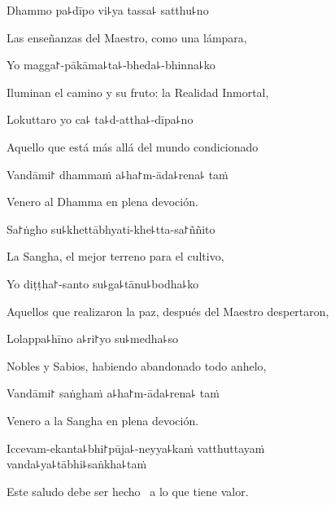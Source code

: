 Dhammo pa꜕dīpo vi꜕ya tassa꜕ satthu꜕no

\begin{english}
  Las enseñanzas del Maestro, como una lámpara,
\end{english}

Yo magga꜓-pākāma꜕ta꜕-bheda꜕-bhinna꜕ko

\begin{english}
  Iluminan el camino y su fruto: la Realidad Inmortal,
\end{english}

Lokuttaro yo ca꜕ ta꜕d-attha꜕-dīpa꜕no

\begin{english}
  Aquello que está más allá del mundo condicionado 
\end{english}

Vandāmi꜓ dhammaṁ a꜕ha꜓m-āda꜕rena꜕ taṁ

\begin{english}
  Venero al Dhamma en plena devoción.
\end{english}

Sa꜓ṅgho su꜕khettābhyati-khe꜕tta-sa꜓ññito

\begin{english}
  La Sangha, el mejor terreno para el cultivo,
\end{english}

Yo diṭṭha꜓-santo su꜕ga꜕tānu꜕bodha꜕ko

\begin{english}
  Aquellos que realizaron la paz, después del Maestro despertaron,
\end{english}

Lolappa꜕hīno a꜕ri꜓yo su꜕medha꜕so

\begin{english}
  Nobles y Sabios, habiendo abandonado todo anhelo, 
\end{english}

Vandāmi꜓ saṅghaṁ a꜕ha꜓m-āda꜕rena꜕ taṁ

\begin{english}
 Venero a la Sangha en plena devoción.
\end{english}

Iccevam-ekanta꜕bhi꜓pūja꜕-neyya꜕kaṁ vatthuttayaṁ \\vanda꜕ya꜕tābhi꜕saṅkha꜕taṁ

\begin{english}
 Este saludo debe ser hecho \pause\ a lo que tiene valor.
\end{english}

